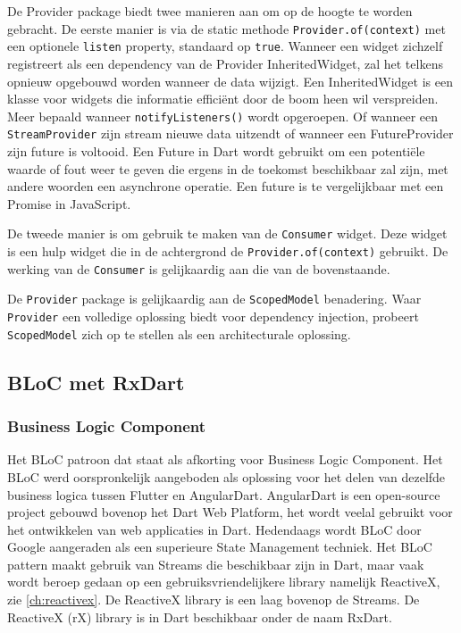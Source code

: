 De Provider package biedt twee manieren aan om op de hoogte te worden gebracht.
\newline
De eerste manier is via de static methode \verb|Provider.of(context)| met een optionele \verb|listen| property, standaard op \verb|true|.
Wanneer een widget zichzelf registreert als een dependency van de Provider InheritedWidget, zal het telkens opnieuw opgebouwd worden wanneer de data wijzigt. Een InheritedWidget is een klasse voor widgets die informatie efficiënt door de boom heen wil verspreiden.
 Meer bepaald wanneer \verb|notifyListeners()| wordt opgeroepen. Of wanneer een \verb|StreamProvider| zijn stream nieuwe data uitzendt of wanneer een FutureProvider zijn future is voltooid. Een Future in Dart wordt gebruikt om een potentiële waarde of fout weer te geven die ergens in de toekomst beschikbaar zal zijn, met andere woorden een asynchrone operatie. Een future is te vergelijkbaar met een Promise in JavaScript.

De tweede manier is om gebruik te maken van de \verb|Consumer| widget. Deze widget is een hulp widget die in de achtergrond de \verb|Provider.of(context)| gebruikt. De werking van de \verb|Consumer| is gelijkaardig aan die van de bovenstaande. 

De \verb|Provider| package is gelijkaardig aan de \verb|ScopedModel| benadering. Waar \verb|Provider| een volledige oplossing biedt voor dependency injection, probeert \verb|ScopedModel| zich op te stellen als een architecturale oplossing.

\subsection{BLoC met RxDart}
\subsubsection{Business Logic Component}
Het BLoC patroon dat staat als afkorting voor Business Logic Component. Het BLoC werd oorspronkelijk aangeboden als oplossing voor het delen van dezelfde business logica tussen Flutter en AngularDart. AngularDart is een open-source project gebouwd bovenop het Dart Web Platform, het wordt veelal gebruikt voor het ontwikkelen van web applicaties in Dart. Hedendaags wordt BLoC door Google aangeraden als een superieure State Management techniek. Het BLoC pattern maakt gebruik van Streams die beschikbaar zijn in Dart, maar vaak wordt beroep gedaan op een gebruiksvriendelijkere library namelijk ReactiveX, zie \ref{ch:reactivex}. De ReactiveX library is een laag bovenop de Streams.
\newline
De ReactiveX (rX) library is in Dart beschikbaar onder de naam RxDart.

